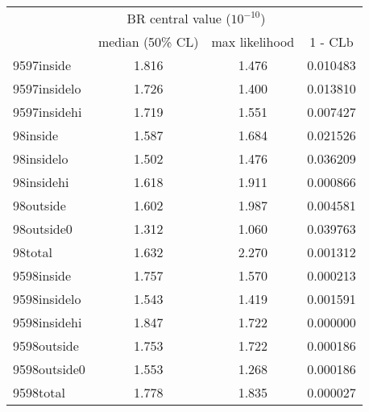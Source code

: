 \documentclass[11pt,twoside]{article}
\begin{document}
\begin{tabular}[]{|l||c|c|c||} 
\hline 
 & \multicolumn{2}{|c|}{BR central value ($10^{-10}$)} & \\ 
 & median (50\% CL) & max likelihood & 1 - CLb \\ 
\hline 
\hline 
  9597inside & 1.816 & 1.476 & 0.010483 \\ 
9597insidelo & 1.726 & 1.400 & 0.013810 \\ 
9597insidehi & 1.719 & 1.551 & 0.007427 \\ 
    98inside & 1.587 & 1.684 & 0.021526 \\ 
  98insidelo & 1.502 & 1.476 & 0.036209 \\ 
  98insidehi & 1.618 & 1.911 & 0.000866 \\ 
   98outside & 1.602 & 1.987 & 0.004581 \\ 
  98outside0 & 1.312 & 1.060 & 0.039763 \\ 
     98total & 1.632 & 2.270 & 0.001312 \\ 
  9598inside & 1.757 & 1.570 & 0.000213 \\ 
9598insidelo & 1.543 & 1.419 & 0.001591 \\ 
9598insidehi & 1.847 & 1.722 & 0.000000 \\ 
 9598outside & 1.753 & 1.722 & 0.000186 \\ 
9598outside0 & 1.553 & 1.268 & 0.000186 \\ 
   9598total & 1.778 & 1.835 & 0.000027 \\ 
\hline 
\hline 
\end{tabular} 

\pagebreak
\end{document}

